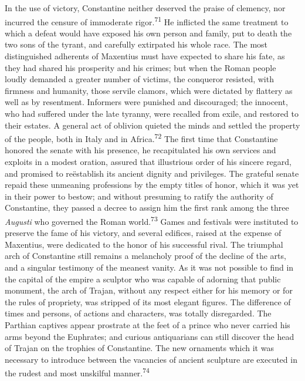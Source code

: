 In the use of victory, Constantine neither deserved the praise of
clemency, nor incurred the censure of immoderate rigor.\textsuperscript{71} He
inflicted the same treatment to which a defeat would have exposed
his own person and family, put to death the two sons of the
tyrant, and carefully extirpated his whole race. The most
distinguished adherents of Maxentius must have expected to share
his fate, as they had shared his prosperity and his crimes; but
when the Roman people loudly demanded a greater number of
victims, the conqueror resisted, with firmness and humanity,
those servile clamors, which were dictated by flattery as well as
by resentment. Informers were punished and discouraged; the
innocent, who had suffered under the late tyranny, were recalled
from exile, and restored to their estates. A general act of
oblivion quieted the minds and settled the property of the
people, both in Italy and in Africa.\textsuperscript{72} The first time that
Constantine honored the senate with his presence, he
recapitulated his own services and exploits in a modest oration,
assured that illustrious order of his sincere regard, and
promised to reëstablish its ancient dignity and privileges. The
grateful senate repaid these unmeaning professions by the empty
titles of honor, which it was yet in their power to bestow; and
without presuming to ratify the authority of Constantine, they
passed a decree to assign him the first rank among the three
\textit{Augusti} who governed the Roman world.\textsuperscript{73} Games and festivals
were instituted to preserve the fame of his victory, and several
edifices, raised at the expense of Maxentius, were dedicated to
the honor of his successful rival. The triumphal arch of
Constantine still remains a melancholy proof of the decline of
the arts, and a singular testimony of the meanest vanity. As it
was not possible to find in the capital of the empire a sculptor
who was capable of adorning that public monument, the arch of
Trajan, without any respect either for his memory or for the
rules of propriety, was stripped of its most elegant figures. The
difference of times and persons, of actions and characters, was
totally disregarded. The Parthian captives appear prostrate at
the feet of a prince who never carried his arms beyond the
Euphrates; and curious antiquarians can still discover the head
of Trajan on the trophies of Constantine. The new ornaments which
it was necessary to introduce between the vacancies of ancient
sculpture are executed in the rudest and most unskilful manner.\textsuperscript{74}

